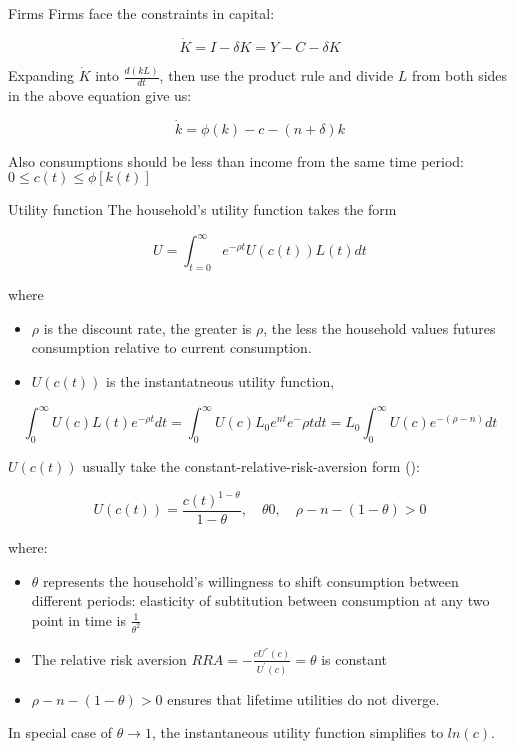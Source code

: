 \documentclass[10pt]{beamer}
\begin{document}
\begin{frame}[label={sec:org53c2c76}]{Firms}
Firms face the constraints in capital:

$$
\dot{K} = I - \delta K = Y - C - \delta K
$$

Expanding \(\dot{K}\) into \(\frac{d(kL)}{dt}\), then use the product rule and divide \(L\) from both sides in the above equation give us:

$$
\dot{k} = \phi(k) - c - (n + \delta)k
$$

Also consumptions should be less than income from the same time period: \(0 \leq c(t) \leq \phi[k(t)]\)
\end{frame}

\begin{frame}[allowframebreaks]{Utility function}
The household's utility function takes the form

$$
U = \int_{t=0}^{\infty} e^{-\rho t}U(c(t))L(t)dt
$$

where
\begin{itemize}
\item \(\rho\) is the \alert{discount rate}, the greater is \(\rho\), the less the household values futures consumption relative to current consumption.
\item \(U(c(t))\) is the \alert{instantatneous utility function},
\end{itemize}

$$
\int_0^{\infty}U(c)L(t)e^{-\rho t} dt = \int_0^{\infty} U(c) L_{0} e^{nt} e^-{\rho t} dt = L_0 \int_{0}^{\infty} U(c)e^{-(\rho-n)}dt
$$


\framebreak

\(U(c(t))\) usually take the \alert{constant-relative-risk-aversion} form (\cite{arrow1965aspects,Pratt1964}):

$$
U(c(t)) = \frac{c(t)^{1-\theta}}{1-\theta}, \quad \theta  0, \quad \rho - n - (1 - \theta) > 0
$$

where:
\begin{itemize}
\item \(\theta\) represents the household's willingness to shift consumption between different periods: elasticity of subtitution between consumption at any two point in time is \(\frac{1}{\theta^{2}}\)
\item The relative risk aversion \(RRA = -\frac{cU^{''}(c)}{U^{'}(c)}= \theta\)   is constant
\item \(\rho - n - (1 - \theta) > 0\) ensures that lifetime utilities do not diverge.
\end{itemize}

In special case of \(\theta \to 1\), the instantaneous utility function simplifies to \(ln(c)\).
\end{frame}
\end{document}
